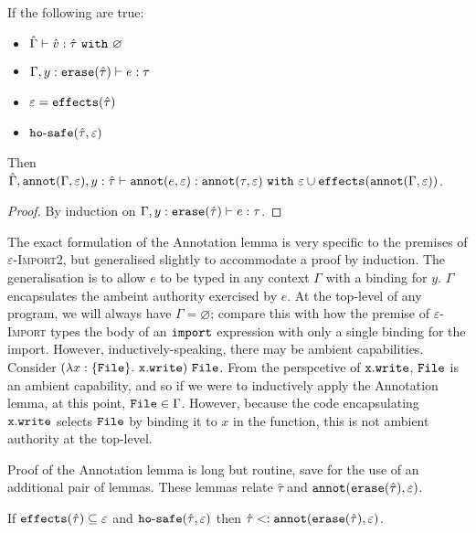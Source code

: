 \begin{lemma}[Annotation]
If the following are true:

\begin{itemize}
	\setlength\itemsep{-0.7em}
	\item $\hat \Gamma \vdash \hat v : \hat \tau~\mathtt{with}~ \varnothing$
	\item $\Gamma, y: \mathtt{erase}(\hat \tau) \vdash e: \tau$
	\item $\varepsilon = \mathtt{effects}(\hat \tau)$
	\item $\mathtt{ho \hbox{-} safe}(\hat \tau, \varepsilon)$
\end{itemize}

\noindent
Then $\hat \Gamma, \mathtt{annot}(\Gamma, \varepsilon), y: \hat \tau \vdash \mathtt{annot}(e, \varepsilon) : \mathtt{annot}(\tau, \varepsilon)~\mathtt{with}~ \varepsilon \cup \mathtt{effects}(\mathtt{annot}(\Gamma, \varepsilon))$.
\end{lemma}

\begin{proof}
By induction on $\Gamma, y: \mathtt{erase}(\hat \tau) \vdash e: \tau$.
\end{proof}

\noindent
The exact formulation of the Annotation lemma is very specific to the premises of \textsc{$\varepsilon$-Import2}, but generalised slightly to accommodate a proof by induction. The generalisation is to allow $e$ to be typed in any context $\Gamma$ with a binding for $y$. $\Gamma$ encapsulates the ambeint authority exercised by $e$. At the top-level of any program, we will always have $\Gamma = \varnothing$; compare this with how the premise of \textsc{$\varepsilon$-Import} types the body of an $\mathtt{import}$ expression with only a single binding for the import. However, inductively-speaking, there may be ambient capabilities. Consider $(\lambda x: \{ \mathtt{File} \}.~\mathtt{x.write})~\mathtt{File}$. From the perspcetive of $\mathtt{x.write}$, $\mathtt{File}$ is an ambient capability, and so if we were to inductively apply the Annotation lemma, at this point, $\mathtt{File} \in \Gamma$. However, because the code encapsulating $\mathtt{x.write}$ selects $\mathtt{File}$ by binding it to $x$ in the function, this is not ambient authority at the top-level.

Proof of the Annotation lemma is long but routine, save for the use of an additional pair of lemmas. These lemmas relate $\hat \tau$ and $\mathtt{annot}(\mathtt{erase}(\hat \tau), \varepsilon)$.

\begin{lemma}
If $\mathtt{effects}(\hat \tau) \subseteq \varepsilon$ and $\mathtt{ho \hbox{-} safe}(\hat \tau, \varepsilon)$ then $\hat \tau <: \mathtt{annot}(\mathtt{erase}(\hat \tau), \varepsilon)$.
\end{lemma}

